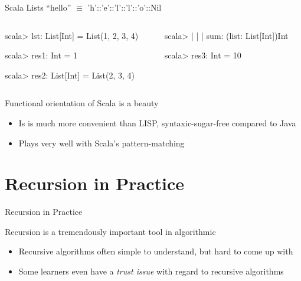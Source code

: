 \begin{Coupe}
\begin{frame}[fragile]{Scala Lists}
  \medskip
   ``hello'' $\equiv$ 'h'::'e'::'l'::'l'::'o'::Nil

  \begin{columns}
    \begin{column}{.37\textwidth}
  \begin{boitecode}{}
scala> 
lst: List[Int] = List(1, 2, 3, 4)

scala> 
res1: Int = 1

scala> 
res2: List[Int] = List(2, 3, 4)
  \end{boitecode}      
    \end{column}
    \begin{column}{.55\textwidth}
  \begin{boitecode}{}
scala> 
     | 
     | 
     | \structure{\}}
sum: (list: List[Int])Int

scala> 
res3: Int = 10
  \end{boitecode}      
    \end{column}
  \end{columns}

  \begin{alertblock}{Functional orientation of Scala is a beauty}
    \begin{itemize}\vspace{-.3\baselineskip}
    \item Is is much more convenient than LISP, syntaxic-sugar-free compared to Java
    \item Plays very well with Scala's pattern-matching
    \end{itemize}
  \end{alertblock}
\end{frame}

\section{Recursion in Practice}
\begin{frame}{Recursion in Practice}

  \begin{block}{Recursion is a tremendously important tool in algorithmic}
    \begin{itemize}
    \item Recursive algorithms often simple to understand, but hard to come
      up with
    \item Some learners even have a \textit{trust issue} with regard to
      recursive algorithms
    \end{itemize}
  \end{block}


\end{frame}
\end{Coupe}
